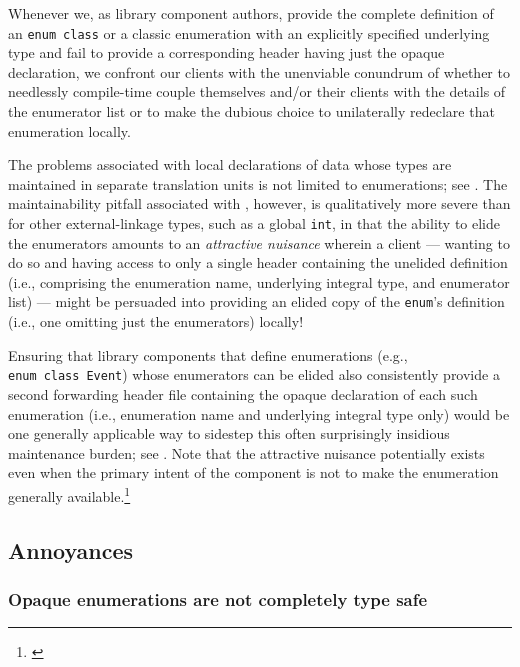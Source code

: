 Whenever we, as library component authors, provide the complete
definition of an \lstinline!enum!~\lstinline!class! or a classic enumeration
with an explicitly specified underlying type and fail to provide a
corresponding header having just the opaque declaration, we confront our
clients with the unenviable conundrum of whether to needlessly
compile-time couple themselves and/or their clients with the details of
the enumerator list or to make the dubious choice to unilaterally
redeclare that enumeration locally.

The problems associated with local declarations of data whose types are
maintained in separate translation units is not limited to enumerations;
see . The maintainability pitfall associated with
, however, is qualitatively more severe than
for other external-linkage types, such as a global \lstinline!int!, in that
the ability to elide the enumerators amounts to an \emph{attractive
nuisance} wherein a client --- wanting to do so and having access to
only a single header containing the unelided definition (i.e.,
comprising the enumeration name, underlying integral type, and
enumerator list) --- might be persuaded into providing an elided copy of
the \lstinline!enum!'s definition (i.e., one omitting just the enumerators)
locally!

Ensuring that library components that define
enumerations (e.g.,
\lstinline!enum!~\lstinline!class!~\lstinline!Event!) whose
enumerators can be elided also consistently provide a second
forwarding header file containing the opaque declaration of each such
enumeration (i.e., enumeration name and underlying integral type only)
would be one generally applicable way to sidestep this often
surprisingly insidious maintenance burden; see . Note that the attractive
nuisance potentially exists even when the primary intent of the component is not to make the enumeration generally
available.\footnote{\cite{wight}}

\subsection[Annoyances]{Annoyances}\label{annoyances}

\subsubsection[Opaque enumerations are not completely type safe]{Opaque enumerations are not completely type safe}\label{opaque-enumerations-are-not-completely-type-safe}

